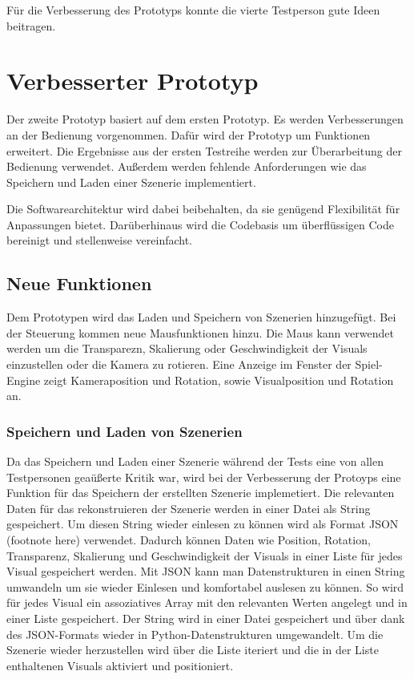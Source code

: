 F\"ur die Verbesserung des Prototyps konnte die vierte Testperson gute Ideen beitragen.

\section{Verbesserter Prototyp}


Der zweite Prototyp basiert auf dem ersten Prototyp. Es werden Verbesserungen an der Bedienung vorgenommen. Daf\"ur wird
der Prototyp um Funktionen erweitert. Die Ergebnisse aus der ersten Testreihe werden zur \"Uberarbeitung der Bedienung verwendet.
Au\ss{}erdem werden fehlende Anforderungen wie das Speichern und Laden einer Szenerie implementiert.

Die Softwarearchitektur wird dabei beibehalten, da sie gen\"ugend Flexibilit\"at f\"ur Anpassungen bietet. Dar\"uberhinaus wird
die Codebasis um \"uberfl\"ussigen Code bereinigt und stellenweise vereinfacht.

\subsection{Neue Funktionen}

Dem Prototypen wird das Laden und Speichern von Szenerien hinzugef\"ugt. Bei der Steuerung kommen neue Mausfunktionen hinzu.
Die Maus kann verwendet werden um die Transparezn, Skalierung oder Geschwindigkeit der Visuals einzustellen oder die Kamera
zu rotieren.
Eine Anzeige im Fenster der Spiel-Engine zeigt Kameraposition und Rotation, sowie Visualposition und Rotation an.


\subsubsection{Speichern und Laden von Szenerien}

Da das Speichern und Laden einer Szenerie w\"ahrend der Tests eine von allen Testpersonen gea\"u\ss{}erte Kritik war, wird
bei der Verbesserung der Protoyps eine Funktion f\"ur das Speichern der erstellten Szenerie implemetiert.
Die relevanten Daten f\"ur das rekonstruieren der Szenerie werden in einer Datei als String gespeichert. Um diesen String
wieder einlesen zu k\"onnen wird als Format JSON (footnote here) verwendet. Dadurch k\"onnen Daten wie Position, Rotation,
Transparenz, Skalierung und Geschwindigkeit der Visuals in einer Liste f\"ur jedes Visual gespeichert werden.
Mit JSON kann man Datenstrukturen in einen String umwandeln um sie wieder Einlesen und komfortabel auslesen zu k\"onnen.
So wird f\"ur jedes Visual ein assoziatives Array mit den relevanten Werten angelegt und in einer Liste gespeichert.
Der String wird in einer Datei gespeichert und \"uber dank des JSON-Formats wieder in Python-Datenstrukturen umgewandelt.
Um die Szenerie wieder herzustellen wird \"uber die Liste iteriert und die in der Liste enthaltenen Visuals aktiviert und
positioniert.


